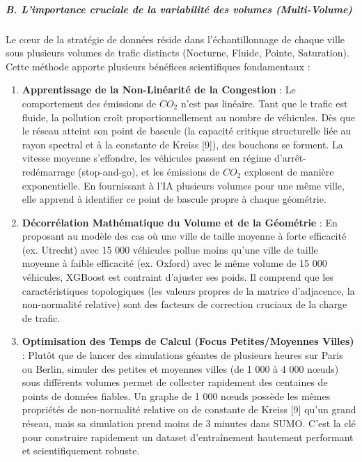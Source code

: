 \documentclass[10pt, a4paper]{article}
\providecommand{\tightlist}{}
\begin{document}
\subparagraph{B. L'importance cruciale de la variabilité des volumes
(Multi-Volume)}\label{b.-limportance-cruciale-de-la-variabilituxe9-des-volumes-multi-volume}

Le cœur de la stratégie de données réside dans l'échantillonnage de
chaque ville sous plusieurs volumes de trafic distincts (Nocturne,
Fluide, Pointe, Saturation). Cette méthode apporte plusieurs bénéfices
scientifiques fondamentaux :

\begin{enumerate}
\def\labelenumi{\arabic{enumi}.}
\tightlist
\item
  \textbf{Apprentissage de la Non-Linéarité de la Congestion} : Le
  comportement des émissions de \(CO_2\) n'est pas linéaire. Tant que le
  trafic est fluide, la pollution croît proportionnellement au nombre de
  véhicules. Dès que le réseau atteint son point de bascule (la capacité
  critique structurelle liée au rayon spectral et à la constante de
  Kreiss {[}9{]}), des bouchons se forment. La vitesse moyenne
  s'effondre, les véhicules passent en régime d'arrêt-redémarrage
  (stop-and-go), et les émissions de \(CO_2\) explosent de manière
  exponentielle. En fournissant à l'IA plusieurs volumes pour une même
  ville, elle apprend à identifier ce point de bascule propre à chaque
  géométrie.
\item
  \textbf{Décorrélation Mathématique du Volume et de la Géométrie} : En
  proposant au modèle des cas où une ville de taille moyenne à forte
  efficacité (ex. Utrecht) avec 15 000 véhicules pollue moins qu'une
  ville de taille moyenne à faible efficacité (ex. Oxford) avec le même
  volume de 15 000 véhicules, XGBoost est contraint d'ajuster ses poids.
  Il comprend que les caractéristiques topologiques (les valeurs propres
  de la matrice d'adjacence, la non-normalité relative) sont des
  facteurs de correction cruciaux de la charge de trafic.
\item
  \textbf{Optimisation des Temps de Calcul (Focus Petites/Moyennes
  Villes)} : Plutôt que de lancer des simulations géantes de plusieurs
  heures sur Paris ou Berlin, simuler des petites et moyennes villes (de
  1 000 à 4 000 nœuds) sous différents volumes permet de collecter
  rapidement des centaines de points de données fiables. Un graphe de 1
  000 nœuds possède les mêmes propriétés de non-normalité relative ou de
  constante de Kreiss {[}9{]} qu'un grand réseau, mais sa simulation
  prend moins de 3 minutes dans SUMO. C'est la clé pour construire
  rapidement un dataset d'entraînement hautement performant et
  scientifiquement robuste.
\end{enumerate}
\end{document}
